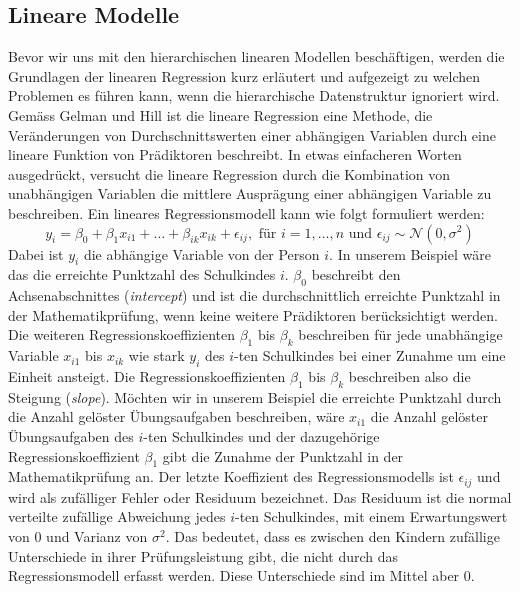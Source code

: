 \documentclass[12pt]{article}\usepackage[]{graphicx}\usepackage[]{color}
\begin{document}
\subsection{Lineare Modelle} \label{section:linear_model}
Bevor wir uns mit den hierarchischen linearen Modellen beschäftigen, werden die Grundlagen der linearen Regression kurz erläutert und aufgezeigt zu welchen Problemen es führen kann, wenn die hierarchische Datenstruktur ignoriert wird. Gemäss Gelman und Hill \citeyearpar{andrew_data} ist die lineare Regression eine Methode, die Veränderungen von Durchschnittswerten einer abhängigen Variablen durch eine lineare Funktion von Prädiktoren beschreibt. In etwas einfacheren Worten ausgedrückt, versucht die lineare Regression durch die Kombination von unabhängigen Variablen die mittlere Ausprägung einer abhängigen Variable zu beschreiben. Ein lineares Regressionsmodell kann wie folgt formuliert werden:
\begin{equation} \label{eq:ols_model}
y_{i} = \beta_{0} + \beta_{1}x_{i1} + \dots + \beta_{ik}x_{ik} + \epsilon_{ij}, \text{ für } i = 1, \dots, n \text{ und } \epsilon_{ij} \sim \mathcal{N}(0,\sigma^{2})
\end{equation}
Dabei ist $y_{i}$ die abhängige Variable von der Person $i$. In unserem Beispiel wäre das die erreichte Punktzahl des Schulkindes $i$. $\beta_0$ beschreibt den Achsenabschnittes (\textit{intercept}) und ist die durchschnittlich erreichte Punktzahl in der Mathematikprüfung, wenn keine weitere Prädiktoren berücksichtigt werden. Die weiteren Regressionskoeffizienten $\beta_{1}$ bis $\beta_{k}$ beschreiben für jede unabhängige Variable $x_{i1}$ bis $x_{ik}$ wie stark $y_{i}$ des $i$-ten Schulkindes bei einer Zunahme um eine Einheit ansteigt. Die Regressionskoeffizienten $\beta_{1}$ bis $\beta_{k}$ beschreiben also die Steigung (\textit{slope}). Möchten wir in unserem Beispiel die erreichte Punktzahl durch die Anzahl gelöster Übungsaufgaben beschreiben, wäre $x_{i1}$ die Anzahl gelöster Übungsaufgaben des $i$-ten Schulkindes und der dazugehörige Regressionskoeffizient $\beta_{1}$ gibt die Zunahme der Punktzahl in der Mathematikprüfung an. Der letzte Koeffizient des Regressionsmodells ist $\epsilon_{ij}$ und wird als zufälliger Fehler oder Residuum bezeichnet. Das Residuum ist die normal verteilte zufällige Abweichung jedes $i$-ten Schulkindes, mit einem Erwartungswert von 0 und Varianz von $\sigma^{2}$. Das bedeutet, dass es zwischen den Kindern zufällige Unterschiede in ihrer Prüfungsleistung gibt, die nicht durch das Regressionsmodell erfasst werden. Diese Unterschiede sind im Mittel aber 0. 
\end{document}
